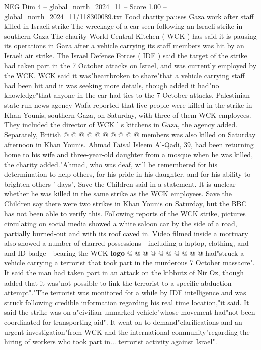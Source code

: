 \begin{textsample}{NEG Dim 4 – global\_north\_2024\_11 – Score 1.00 – global\_north\_2024\_11/118300089.txt}  \label{ex:f4_neg_168}
Food charity pauses Gaza work after staff killed in Israeli strike The wreckage of a car seen following an Israeli strike in southern Gaza The charity World Central Kitchen ( WCK ) has said it is pausing its operations in Gaza after a vehicle carrying its staff members was hit by an Israeli air strike.
The Israel Defense Forces ( IDF ) said the target of the strike had taken part in the 7 October attacks on Israel, and was currently employed by the WCK.
WCK said it was"heartbroken to share"that a vehicle carrying staff had been hit and it was seeking more details, though added it had"no knowledge"that anyone in the car had ties to the 7 October attacks.
Palestinian state-run news agency Wafa reported that five people were killed in the strike in Khan Younis, southern Gaza, on Saturday, with three of them WCK employees.
They included the director of WCK ' s kitchens in Gaza, the agency added.
Separately, British @ @ @ @ @ @ @ @ @ @ members was also killed on Saturday afternoon in Khan Younis.
Ahmad Faisal Isleem Al-Qadi, 39, had been returning home to his wife and three-year-old daughter from a mosque when he was killed, the charity added."Ahmad, who was deaf, will be remembered for his determination to help others, for his pride in his daughter, and for his ability to brighten others ' days", Save the Children said in a statement.
It is unclear whether he was killed in the same strike as the WCK employees.
Save the Children say there were two strikes in Khan Younis on Saturday, but the BBC has not been able to verify this.
Following reports of the WCK strike, pictures circulating on social media showed a white saloon car by the side of a road, partially burned-out and with its roof caved in.
Video filmed inside a mortuary also showed a number of charred possessions - including a laptop, clothing, and and ID badge - bearing the WCK \textbf{logo} @ @ @ @ @ @ @ @ @ @ had"struck a vehicle carrying a terrorist that took part in the murderous 7 October massacre".
It said the man had taken part in an attack on the kibbutz of Nir Oz, though added that it was"not possible to link the terrorist to a specific abduction attempt"."The terrorist was monitored for a while by IDF intelligence and was struck following credible information regarding his real time location,"it said.
It said the strike was on a"civilian unmarked vehicle"whose movement had"not been coordinated for transporting aid".
It went on to demand"clarifications and an urgent investigation"from WCK and the international community"regarding the hiring of workers who took part in... terrorist activity against Israel".

\end{textsample}
